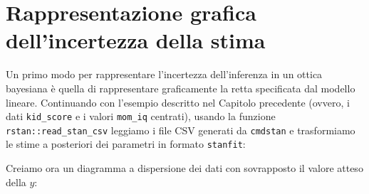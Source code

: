 \documentclass[
  11pt,
]{krantz}
\makeatletter
\newenvironment{Shaded}{\begin{snugshade}}{\end{snugshade}}
\newcommand{\AttributeTok}[1]{\textcolor[rgb]{0.61,0.61,0.61}{#1}}
\newcommand{\FunctionTok}[1]{\textcolor[rgb]{0,0,0}{#1}}
\newcommand{\NormalTok}[1]{#1}
\newcommand{\OtherTok}[1]{\textcolor[rgb]{0.37,0.37,0.37}{#1}}
\newcommand{\SpecialCharTok}[1]{\textcolor[rgb]{0,0,0}{#1}}
\newenvironment{kframe}{%
\medskip{}
\setlength{\fboxsep}{.8em}
 \def\at@end@of@kframe{}%
 \ifinner\ifhmode%
  \def\at@end@of@kframe{\end{minipage}}%
  \begin{minipage}{\columnwidth}%
 \fi\fi%
 \def\FrameCommand##1{\hskip\@totalleftmargin \hskip-\fboxsep
 \colorbox{shadecolor}{##1}\hskip-\fboxsep
     \hskip-\linewidth \hskip-\@totalleftmargin \hskip\columnwidth}%
 \MakeFramed {\advance\hsize-\width
   \@totalleftmargin\z@ \linewidth\hsize
   \@setminipage}}%
 {\par\unskip\endMakeFramed%
 \at@end@of@kframe}
\renewenvironment{Shaded}{\begin{kframe}}{\end{kframe}}
\theoremstyle{definition}
\theoremstyle{definition}
\theoremstyle{definition}
\theoremstyle{definition}
\theoremstyle{remark}
\makeatother
\begin{document}
\hypertarget{rappresentazione-grafica-dellincertezza-della-stima}{%
\section{Rappresentazione grafica dell'incertezza della stima}\label{rappresentazione-grafica-dellincertezza-della-stima}}

Un primo modo per rappresentare l'incertezza dell'inferenza in un ottica bayesiana è quella di rappresentare graficamente la retta specificata dal modello lineare. Continuando con l'esempio descritto nel Capitolo precedente (ovvero, i dati \texttt{kid\_score} e i valori \texttt{mom\_iq} centrati), usando la funzione \texttt{rstan::read\_stan\_csv} leggiamo i file CSV generati da \texttt{cmdstan} e trasformiamo le stime a posteriori dei parametri in formato \texttt{stanfit}:

\begin{Shaded}
\end{Shaded}

Creiamo ora un diagramma a dispersione dei dati con sovrapposto il valore atteso della \(y\):

\begin{Shaded}
\end{Shaded}
\end{document}
